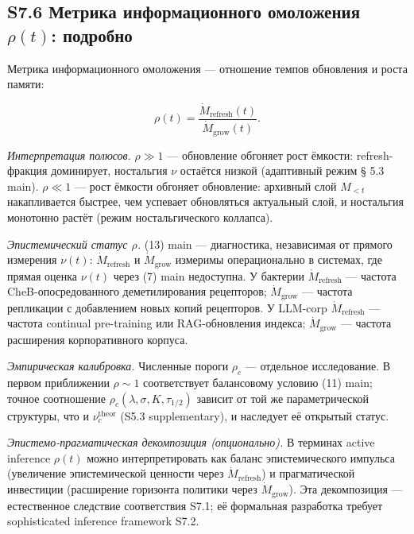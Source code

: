 \documentclass[pdflatex,sn-mathphys-ay]{sn-jnl}
\providecommand{\lt}{<}\providecommand{\gt}{>}
\begin{document}
\subsection*{\texorpdfstring{S7.6 Метрика информационного омоложения \(\rho(t)\): подробно}{S7.6 Метрика информационного омоложения \textbackslash rho(t): подробно}}\label{s7.6-ux43cux435ux442ux440ux438ux43aux430-ux438ux43dux444ux43eux440ux43cux430ux446ux438ux43eux43dux43dux43eux433ux43e-ux43eux43cux43eux43bux43eux436ux435ux43dux438ux44f-rhot-ux43fux43eux434ux440ux43eux431ux43dux43e}



Метрика информационного омоложения --- отношение темпов обновления и роста памяти:



\[\rho(t) = \frac{\dot{M}_{\text{refresh}}(t)}{\dot{M}_{\text{grow}}(t)}.\]



\emph{Интерпретация полюсов.} \(\rho \gg 1\) --- обновление обгоняет рост ёмкости: refresh-фракция доминирует, ностальгия \(\nu\) остаётся низкой (адаптивный режим § 5.3 main). \(\rho \ll 1\) --- рост ёмкости обгоняет обновление: архивный слой \(M_{\lt t}\) накапливается быстрее, чем успевает обновляться актуальный слой, и ностальгия монотонно растёт (режим ностальгического коллапса).



\emph{Эпистемический статус \(\rho\).} (13) main --- диагностика, независимая от прямого измерения \(\nu(t)\): \(\dot{M}_{\text{refresh}}\) и \(\dot{M}_{\text{grow}}\) измеримы операционально в системах, где прямая оценка \(\nu(t)\) через (7) main недоступна. У бактерии \(\dot M_{\text{refresh}}\) --- частота CheB-опосредованного деметилирования рецепторов; \(\dot M_{\text{grow}}\) --- частота репликации с добавлением новых копий рецепторов. У LLM-corp \(\dot M_{\text{refresh}}\) --- частота continual pre-training или RAG-обновления индекса; \(\dot M_{\text{grow}}\) --- частота расширения корпоративного корпуса.



\emph{Эмпирическая калибровка.} Численные пороги \(\rho_c\) --- отдельное исследование. В первом приближении \(\rho \sim 1\) соответствует балансовому условию (11) main; точное соотношение \(\rho_c(\lambda, \sigma, K, \tau_{1/2})\) зависит от той же параметрической структуры, что и \(\nu_c^{\text{theor}}\) (S5.3 supplementary), и наследует её открытый статус.



\emph{Эпистемо-прагматическая декомпозиция (опционально).} В терминах active inference \(\rho(t)\) можно интерпретировать как баланс эпистемического импульса (увеличение эпистемической ценности через \(\dot{M}_{\text{refresh}}\)) и прагматической инвестиции (расширение горизонта политики через \(\dot{M}_{\text{grow}}\)). Эта декомпозиция --- естественное следствие соответствия S7.1; её формальная разработка требует sophisticated inference framework S7.2.
\end{document}
